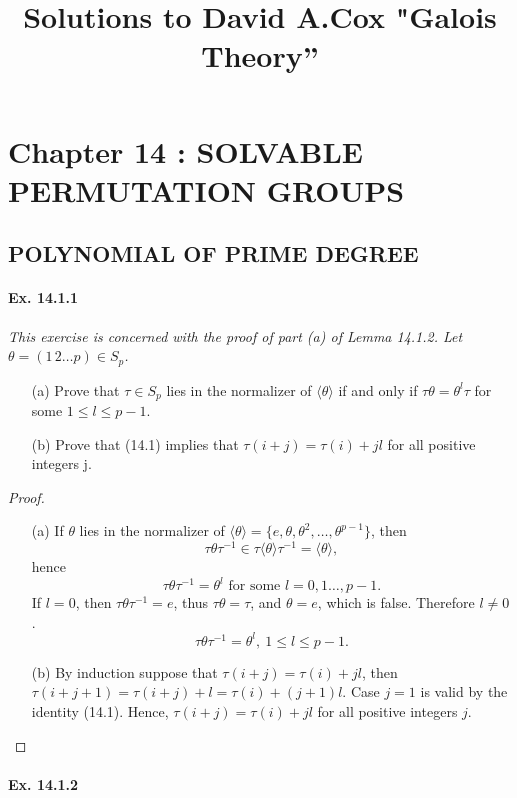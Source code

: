 \documentclass[11pt,a4paper]{article}
\title{Solutions to David A.Cox  "Galois Theory''}
\begin{document}
\section{Chapter 14 : SOLVABLE PERMUTATION GROUPS}

\subsection{POLYNOMIAL OF PRIME DEGREE}

\paragraph{Ex. 14.1.1}
{\it This exercise is concerned with the proof of part (a) of Lemma 14.1.2. Let $\theta =(1\, 2 \ldots p)\in S_p$.
\begin{enumerate}
\item[(a)] Prove that $\tau\in S_p$ lies in the normalizer of $\langle\theta\rangle$ if and only if $\tau\theta =\theta^l\tau$ for some $1\leq l\leq p-1$.
\item[(b)] Prove that (14.1) implies that $\tau(i+j)=\tau(i)+jl$ for all positive integers j.
\end{enumerate}
}
\begin{proof}
\begin{enumerate}
\item[(a)]
If $\theta$ lies in the normalizer of $\langle \theta\rangle = \{e,\theta,\theta^2,\ldots,\theta^{p-1}\}$, then
$$\tau \theta \tau^{-1} \in \tau \langle \theta \rangle \tau^{-1}= \langle \theta \rangle,$$
hence
$$\tau \theta \tau^{-1} =\theta^l \text{ for some } l = 0,1\ldots,p-1.$$
If $l = 0$, then $\tau \theta \tau^{-1} = e$, thus $\tau \theta = \tau$, and $\theta = e$, which is false. Therefore $l \ne 0$.
$$\tau \theta \tau^{-1} =\theta^l , \ 1\leq l \leq p-1.$$

 \item[(b)] By induction suppose that $\tau(i+j)=\tau(i)+jl$, then $\tau(i+j+1)=\tau(i+j)+l=\tau(i)+(j+1)l$. Case $j=1$ is valid by the identity (14.1). Hence, $\tau(i+j)=\tau(i)+jl$ for all positive integers $j$.  
\end{enumerate}
\end{proof}

\paragraph{Ex. 14.1.2}
\end{document}
